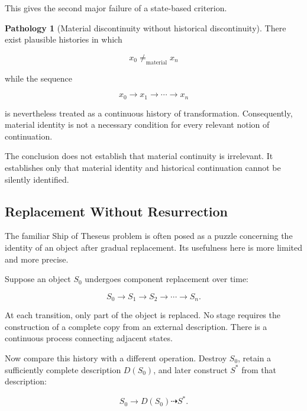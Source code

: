 \documentclass[
  11pt,
  a4paper,
  DIV=12,
  BCOR=0mm,
  parskip=half-
]{scrartcl}
\theoremstyle{definition}
\newtheorem{pathology}[definition]{Pathology}
\theoremstyle{plain}
\theoremstyle{remark}
\begin{document}
This gives the second major failure of a state-based criterion.

\begin{pathology}[Material discontinuity without historical discontinuity]
\label{path:material-discontinuity}
There exist plausible histories in which

\[
  x_0\neq_{\mathrm{material}}x_n
\]

while the sequence

\[
  x_0
  \longrightarrow
  x_1
  \longrightarrow
  \cdots
  \longrightarrow
  x_n
\]

is nevertheless treated as a continuous history of transformation.
Consequently, material identity is not a necessary condition for every
relevant notion of continuation.
\end{pathology}

The conclusion does not establish that material continuity is irrelevant.
It establishes only that material identity and historical continuation cannot
be silently identified.


\subsection{Replacement Without Resurrection}
\label{sec:replacement}

The familiar Ship of Theseus problem is often posed as a puzzle concerning the
identity of an object after gradual replacement. Its usefulness here is more
limited and more precise.

Suppose an object \(S_0\) undergoes component replacement over time:

\[
  S_0
  \longrightarrow
  S_1
  \longrightarrow
  S_2
  \longrightarrow
  \cdots
  \longrightarrow
  S_n.
\]

At each transition, only part of the object is replaced. No stage requires the
construction of a complete copy from an external description. There is a
continuous process connecting adjacent states.

Now compare this history with a different operation. Destroy \(S_0\), retain
a sufficiently complete description \(D(S_0)\), and later construct \(S^\ast\)
from that description:

\[
  S_0
  \longrightarrow
  D(S_0)
  \dashrightarrow
  S^\ast.
\]
\end{document}
